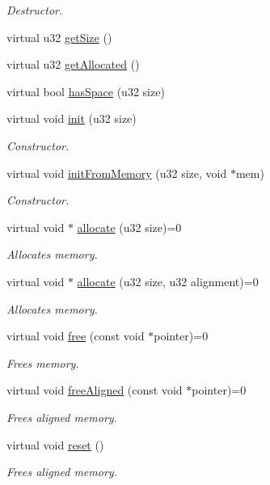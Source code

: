 \begin{DoxyCompactItemize}
\begin{DoxyCompactList}\small\item\em Destructor. \end{DoxyCompactList}\item 
virtual u32 \hyperlink{classDE_1_1Allocator_af8e9d8df95e03bd2a5d2242d67c37ff2}{get\+Size} ()
\item 
virtual u32 \hyperlink{classDE_1_1Allocator_ab1cd017ccd297924b3afec3588f42848}{get\+Allocated} ()
\item 
virtual bool \hyperlink{classDE_1_1Allocator_a911a1c5749601a4950c0f88e828334df}{has\+Space} (u32 size)
\item 
virtual void \hyperlink{classDE_1_1Allocator_a4478c3fd1883e6d5fca88a479f0ccd12}{init} (u32 size)
\begin{DoxyCompactList}\small\item\em Constructor. \end{DoxyCompactList}\item 
virtual void \hyperlink{classDE_1_1Allocator_a3e89def629d55d2f6cdb0d0a4b9684f6}{init\+From\+Memory} (u32 size, void $\ast$mem)
\begin{DoxyCompactList}\small\item\em Constructor. \end{DoxyCompactList}\item 
virtual void $\ast$ \hyperlink{classDE_1_1Allocator_a25c66f6c09ca69ef083219fc7c2b0392}{allocate} (u32 size)=0
\begin{DoxyCompactList}\small\item\em Allocates memory. \end{DoxyCompactList}\item 
virtual void $\ast$ \hyperlink{classDE_1_1Allocator_ae8e197bc4bab60a9321b8c25596e927d}{allocate} (u32 size, u32 alignment)=0
\begin{DoxyCompactList}\small\item\em Allocates memory. \end{DoxyCompactList}\item 
virtual void \hyperlink{classDE_1_1Allocator_a9a01f5da5adafc6d5cee9b3e3e9859c4}{free} (const void $\ast$pointer)=0
\begin{DoxyCompactList}\small\item\em Frees memory. \end{DoxyCompactList}\item 
virtual void \hyperlink{classDE_1_1Allocator_a765f3ff9d6ff095bdfe4674652542a3d}{free\+Aligned} (const void $\ast$pointer)=0
\begin{DoxyCompactList}\small\item\em Frees aligned memory. \end{DoxyCompactList}\item 
virtual void \hyperlink{classDE_1_1Allocator_a0a08a7747d50ec63e6eaa1740f5de347}{reset} ()\hypertarget{classDE_1_1Allocator_a0a08a7747d50ec63e6eaa1740f5de347}{}\label{classDE_1_1Allocator_a0a08a7747d50ec63e6eaa1740f5de347}

\begin{DoxyCompactList}\small\item\em Frees aligned memory. \end{DoxyCompactList}\end{DoxyCompactItemize}
